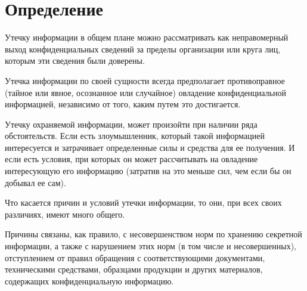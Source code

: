 \section{Определение}

Утечку информации  в общем плане можно рассматривать как неправомерный выход конфиденциальных сведений за пределы организации или круга лиц, которым эти сведения были доверены.

Утечка информации по своей сущности всегда предполагает противоправное (тайное или явное, осознанное или случайное) овладение конфиденциальной информацией, независимо от того, каким путем это достигается.

Утечку охраняемой информации, может произойти при наличии ряда обстоятельств. Если есть злоумышленник, который такой информацией интересуется и затрачивает определенные силы и средства для ее получения. И если есть условия, при которых он может рассчитывать на овладение интересующую его информацию (затратив на это меньше сил, чем если бы он добывал ее сам).

Что касается причин и условий утечки информации, то они, при всех своих различиях, имеют много общего.

Причины связаны, как правило, с несовершенством норм по хранению секретной информации, а также с нарушением этих норм (в том числе и несовершенных), отступлением от правил обращения с соответствующими документами, техническими средствами, образцами продукции и других материалов, содержащих конфиденциальную информацию.

